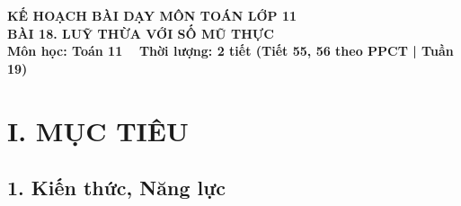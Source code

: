 \documentclass[12pt, a4paper]{article}
\begin{document}
\begin{center}
    {\fontsize{14pt}{17pt}\selectfont \textbf{KẾ HOẠCH BÀI DẠY MÔN TOÁN LỚP 11}}\\[6pt]
    {\fontsize{16pt}{19pt}\selectfont \textbf{BÀI 18. LUỸ THỪA VỚI SỐ MŨ THỰC}}\\[4pt]
    {\fontsize{12pt}{15pt}\selectfont \textbf{Môn học: Toán 11} \ \textbar \ \textbf{Thời lượng: 2 tiết (Tiết 55, 56 theo PPCT | Tuần 19)}}
\end{center}

\vspace{5pt}

\section*{I. MỤC TIÊU}

\subsection*{1. Kiến thức, Năng lực}
\end{document}
